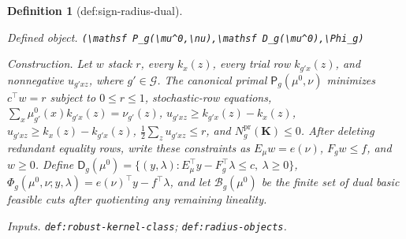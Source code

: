 \documentclass{article}
\newtheorem{definition}{Definition}
\begin{document}
\begin{definition}[def:sign-radius-dual]\label{def:sign-radius-dual}
\par\smallskip\noindent\emph{Defined object.} \texttt{(\textbackslash{}\allowbreak{}mathsf P\_\allowbreak{}g(\textbackslash{}\allowbreak{}mu\textasciicircum{}0,\allowbreak{}\textbackslash{}\allowbreak{}nu),\allowbreak{}\textbackslash{}\allowbreak{}mathsf D\_\allowbreak{}g(\textbackslash{}\allowbreak{}mu\textasciicircum{}0),\allowbreak{}\textbackslash{}\allowbreak{}Phi\_\allowbreak{}g)}
\par\smallskip\noindent\emph{Construction.} Let \(w\) stack \(r\), every \(k_x(z)\), every trial row \(k_{g'x}(z)\), and nonnegative \(u_{g'xz}\), where \(g'\in\mathcal G\). The canonical primal \(\mathsf P_g(\mu^0,\nu)\) minimizes \(c^\top w=r\) subject to \(0\le r\le1\), stochastic-row equations, \(\sum_x\mu_{g'}^0(x)k_{g'x}(z)=\nu_{g'}(z)\), \(u_{g'xz}\ge k_{g'x}(z)-k_x(z)\), \(u_{g'xz}\ge k_x(z)-k_{g'x}(z)\), \(\tfrac12\sum_z u_{g'xz}\le r\), and \(N_g^{\mathrm{pr}}(\mathbf K)\le0\). After deleting redundant equality rows, write these constraints as \(E_{\mu}w=e(\nu)\), \(F_gw\le f\), and \(w\ge0\). Define \(\mathsf D_g(\mu^0)=\{(y,\lambda):E_{\mu}^{\top}y-F_g^{\top}\lambda\le c,\ \lambda\ge0\}\), \(\Phi_g(\mu^0,\nu;y,\lambda)=e(\nu)^{\top}y-f^{\top}\lambda\), and let \(\mathcal B_g(\mu^0)\) be the finite set of dual basic feasible cuts after quotienting any remaining lineality.
\par\smallskip\noindent\emph{Inputs.} \texttt{def:\allowbreak{}robust-\allowbreak{}kernel-\allowbreak{}class}; \texttt{def:\allowbreak{}radius-\allowbreak{}objects}.
\end{definition}
\end{document}
